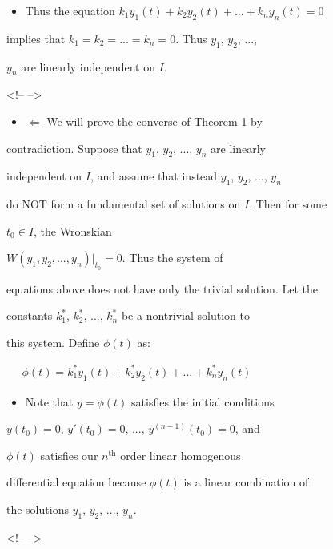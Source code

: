 \begin{itemize}
    \item Thus the equation $k_1y_1(t) + k_2y_2(t) + ... + k_ny_n(t) = 0$
\end{itemize}
    implies that $k_1 = k_2 = ... = k_n = 0$. Thus $y_1$, $y_2$, ...,

    $y_n$ are linearly independent on $I$.



<!-- -->



\begin{itemize}
    \item $\Leftarrow$ We will prove the converse of Theorem 1 by
\end{itemize}
    contradiction. Suppose that $y_1$, $y_2$, ..., $y_n$ are linearly

    independent on $I$, and assume that instead $y_1$, $y_2$, ..., $y_n$

    do NOT form a fundamental set of solutions on $I$. Then for some

    $t_0 \in I$, the Wronskian

    $W(y_1, y_2, ..., y_n)  \bigg|_{t_0} = 0$. Thus the system of

    equations above does not have only the trivial solution. Let the

    constants $k_1^*$, $k_2^*$, ..., $k_n^*$ be a nontrivial solution to

    this system. Define $\phi(t)$ as:



$\begin{aligned} \quad \phi(t) = k_1^* y_1(t) + k_2^* y_2(t) + ... + k_n^* y_n(t) \end{aligned}$



\begin{itemize}
    \item Note that $y = \phi(t)$ satisfies the initial conditions
\end{itemize}
    $y(t_0) = 0$, $y'(t_0) = 0$, ..., $y^{(n-1)} (t_0) = 0$, and

    $\phi(t)$ satisfies our $n^{\mathrm{th}}$ order linear homogenous

    differential equation because $\phi(t)$ is a linear combination of

    the solutions $y_1$, $y_2$, ..., $y_n$.



<!-- -->



